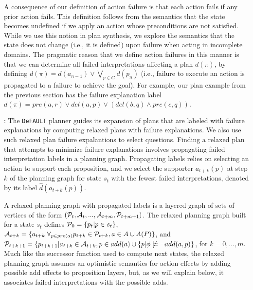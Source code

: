 \documentclass[letterpaper]{article}
\def\und#1{\noindent{\bf #1}:}
\def\citep#1{\cite{#1}}
\def\default{{\tt DeFAULT}}
\begin{document}
A consequence of our definition of action failure is that each action fails if
any prior action fails.  This definition follows from the semantics that the
state becomes undefined if we apply an action whose preconditions are not
satisfied.  While we use this notion in plan synthesis, we explore the semantics
that the state does not change (i.e., it is defined) upon failure when acting in
incomplete domains.  The pragmatic reason that we define action failures in this
manner is that we can determine all failed interpretations affecting a plan $d(\pi)$,
by defining $d(\pi) = d({a}_{n-1}) \vee \bigvee_{p \in G} d(p_n)$ (i.e.,
failure to execute an action is propagated to a
failure to achieve the goal). For example, our plan example from the previous
section has the failure explanation label $d(\pi) = 
pre(a, r) \vee  del(a, p) \vee (del(b, q) \wedge pre(c, q))$.

\und{Incomplete Domain Relaxed Plans} The \default{} planner
\citep{bryce-icaps11} guides its expansion of plans that are labeled with
failure explanations by computing relaxed plans with failure explanations.  We
also use such relaxed plan failure expalantions to select questions.  Finding a
relaxed plan that attempts to minimize failure explanations involves propagating
failed interpretation labels in a planning graph.  Propagating labels relies on
selecting an action to support each proposition, and we select the supporter
$a_{t+k}(p)$ at step $k$ of the planning graph for state $s_t$ with the
fewest failed interpretations, denoted by its label $\hat{d}(a_{t+k}(p))$.

A relaxed planning graph with propagated labels is a layered graph of sets of
vertices of the form $({\cal P}_t, {\cal A}_t, ..., {\cal A}_{t+m},
{\cal P}_{t+m+1})$. The relaxed planning graph built for a state
${s}_t$ defines ${\cal P}_0 = \{{p}_t | p \in {s}_t\}$,
${\cal A}_{t+k} = \{ {a}_{t+k} | \forall_{p \in {pre}({a})}
{p}_{t+k} \in {\cal P}_{t+k}, {a} \in {A} \cup A(P)\}$, and
${\cal P}_{t+k+1} = \{p_{t+k+1} | {a}_{t+k} \in {\cal A}_{t+k}, p
\in {add}({a}) \cup \{p | \phi\not\models\neg add({a}, p)\}$, for $k
= 0, ..., m$.  Much like the successor function used to compute next states, the
relaxed planning graph assumes an optimistic semantics for action effects by
adding possible add effects to proposition layers, but, as we will explain
below, it associates failed interpretations with the possible adds.
\end{document}
